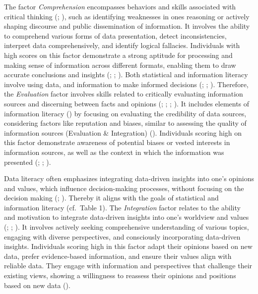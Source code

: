 \documentclass[
  12pt,
  a4paper,
  twoside]{article}
\begin{document}
The factor \emph{Comprehension} encompasses behaviors and skills associated with critical thinking (; ), such as identifying weaknesses in ones reasoning or actively shaping discourse and public dissemination of information. It involves the ability to comprehend various forms of data presentation, detect inconsistencies, interpret data comprehensively, and identify logical fallacies. Individuals with high scores on this factor demonstrate a strong aptitude for processing and making sense of information across different formats, enabling them to draw accurate conclusions and insights (; ; ).
Both statistical and information literacy involve using data, and information to make informed decisions (; ; ).
Therefore, the \emph{Evaluation} factor involves skills related to critically evaluating information sources and discerning between facts and opinions (; ; ; ).
It includes elements of information literacy () by focusing on evaluating the credibility of data sources, considering factors like reputation and biases, similar to assessing the quality of information sources (Evaluation \& Integration) ().
Individuals scoring high on this factor demonstrate awareness of potential biases or vested interests in information sources, as well as the context in which the information was presented (; ; ).

Data literacy often emphasizes integrating data-driven insights into one's opinions and values, which influence decision-making processes, without focusing on the decision making (; ). Thereby it aligns with the goals of statistical and information literacy (cf.~Table 1).
The \emph{Integration} factor relates to the ability and motivation to integrate data-driven insights into one's worldview and values (; ; ). It involves actively seeking comprehensive understanding of various topics, engaging with diverse perspectives, and consciously incorporating data-driven insights. Individuals scoring high in this factor adapt their opinions based on new data, prefer evidence-based information, and ensure their values align with reliable data. They engage with information and perspectives that challenge their existing views, showing a willingness to reassess their opinions and positions based on new data ().
\end{document}
